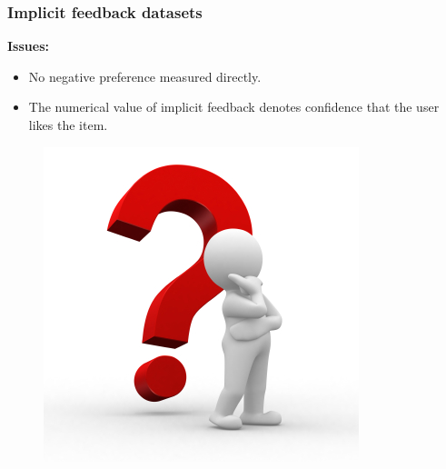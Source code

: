 \begin{frame}
\frametitle{Implicit feedback datasets}
\hspace{-0.7cm}
{\Large
\vspace{5mm}
\textbf{Issues:}
\par}
\vspace{-10mm}
\hspace{-0.7cm}
\begin{minipage}{0.8\linewidth}
\begin{itemize}
    \item No negative preference measured directly.
    \item The numerical value of implicit feedback denotes confidence that the user likes the item.
\end{itemize}

	 \end{minipage}
	 \begin{minipage}{0.2\linewidth}
	 
	    \begin{figure}
            \includegraphics[scale=0.3]{figures/issues.jpg}
		\end{figure}
	 \end{minipage}
\end{frame}